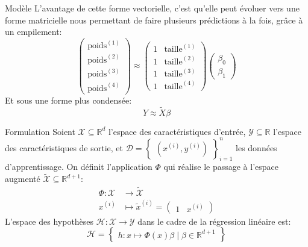 \documentclass[10pt]{beamer}  %
\begin{document}
\begin{frame}{Modèle}
	L'avantage de cette forme vectorielle, c'est qu'elle peut évoluer vers une forme matricielle nous permettant de faire plusieurs prédictions à la fois, grâce à un empilement:
	\begin{equation}
		\begin{pmatrix}\text{poids}^{(1)} \\ \text{poids}^{(2)} \\ \text{poids}^{(3)} \\ \text{poids}^{(4)}\end{pmatrix} \approx \begin{pmatrix}1 & \text{taille}^{(1)} \\ 1 & \text{taille}^{(2)} \\ 1 & \text{taille}^{(3)} \\ 1 & \text{taille}^{(4)} \end{pmatrix} \begin{pmatrix}\beta_0 \\ \beta_1\end{pmatrix}
		\nonumber
	\end{equation}
	\pause
	Et sous une forme plus condensée:
	\begin{equation}
		Y \approx \tilde{X} \beta
		\nonumber
	\end{equation}
\end{frame}

\begin{frame}{Formulation}
	Soient $\mathcal{X} \subseteq \mathbb{R}^d$ l'espace des caractéristiques d'entrée,  $\mathcal{Y} \subseteq \mathbb{R}$ l'espace des caractéristiques de sortie, et $\mathcal{D} = \begin{Bmatrix}(x^{(i)}, y^{(i)})\end{Bmatrix}_{i=1}^n$ les données d'apprentissage. On définit l'application $\Phi$ qui réalise le passage à l'espace augmenté $\tilde{\mathcal{X}} \subseteq \mathbb{R}^{d+1}$:
	\begin{equation}
		\begin{aligned}
			\Phi: \mathcal{X} &\to \tilde{\mathcal{X}} \\
			x^{(i)} &\mapsto \tilde{x}^{(i)} = \begin{pmatrix}1 & x^{(i)}\end{pmatrix}
			\nonumber
		\end{aligned}
	\end{equation}
	L'espace des hypothèses $\mathcal{H}: \mathcal{X} \to \mathcal{Y}$ dans le cadre de la régression linéaire est:
	\begin{equation}
		\mathcal{H} = \begin{Bmatrix}h: x \mapsto \Phi(x) \beta \mid \beta \in \mathbb{R}^{d+1}\end{Bmatrix}
		\nonumber
	\end{equation}
\end{frame}
\end{document}
